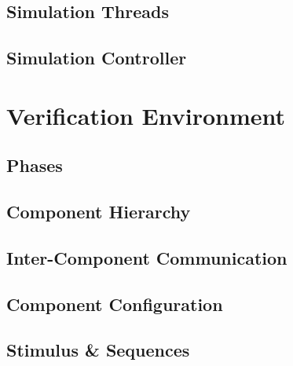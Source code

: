 \documentclass[12pt]{report}
\begin{document}
\subsection{Simulation Threads} %

\subsection{Simulation Controller} %

\section{Verification Environment} %

\subsection{Phases} %

\subsection{Component Hierarchy} %

\subsection{Inter-Component Communication} %

\subsection{Component Configuration} %

\subsection{Stimulus \& Sequences} %
\end{document}
